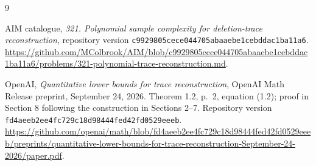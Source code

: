 \documentclass[11pt]{article}
\begin{document}
\begin{thebibliography}{9}
\raggedright
{}
AIM catalogue, \emph{321. Polynomial sample complexity for deletion-trace
reconstruction}, repository version
\texttt{c9929805cece044705abaaebe1cebddac1ba11a6}.
\url{https://github.com/MColbrook/AIM/blob/c9929805cece044705abaaebe1cebddac1ba11a6/problems/321-polynomial-trace-reconstruction.md}.

OpenAI, \emph{Quantitative lower bounds for trace reconstruction},
OpenAI Math Release preprint, September 24, 2026.
Theorem 1.2, p.~2, equation (1.2); proof in Section 8 following the
construction in Sections 2--7. Repository version
\texttt{fd4aeeb2ee4fc729c18d98444fed42fd0529eeeb}.
\url{https://github.com/openai/math/blob/fd4aeeb2ee4fc729c18d98444fed42fd0529eeeb/preprints/quantitative-lower-bounds-for-trace-reconstruction-September-24-2026/paper.pdf}.
\end{thebibliography}
\end{document}
